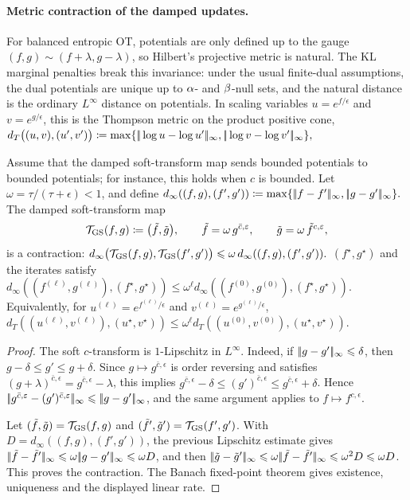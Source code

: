 \paragraph{Metric contraction of the damped updates.}
For balanced entropic OT, potentials are only defined up to the gauge $(f,g)\sim(f+\lambda,g-\lambda)$, so Hilbert's projective metric is natural. The KL marginal penalties break this invariance: under the usual finite-dual assumptions, the dual potentials are unique up to $\al$- and $\be$-null sets, and the natural distance is the ordinary $L^\infty$ distance on potentials. In scaling variables $u=e^{f/\epsilon}$ and $v=e^{g/\epsilon}$, this is the Thompson metric on the product positive cone,
\(d_T\big((u,v),(u',v')\big) \eqdef \max\{\norm{\log u-\log u'}_\infty,\norm{\log v-\log v'}_\infty\},\)
\begin{prop}\label{prop-unbalanced-sinkhorn-contraction}
Assume that the damped soft-transform map sends bounded potentials to bounded potentials; for instance, this holds when \(c\) is bounded. Let
$\omega=\tau/(\tau+\epsilon)<1$, and define
\(d_\infty((f,g),(f',g')) \eqdef \max\{\norm{f-f'}_\infty,\norm{g-g'}_\infty\}.\)
The damped soft-transform map
\[
\mathcal T_{\rm GS}(f,g)
\eqdef
\big(\tilde f,\tilde g\big),
\qquad
\tilde f=\omega\,g^{\bar c,\epsilon},
\qquad
\tilde g=\omega\,\tilde f^{c,\epsilon},
\]
is a contraction: \(d_\infty\big(\mathcal T_{\rm GS}(f,g),\mathcal T_{\rm GS}(f',g')\big) \leq \omega\, d_\infty((f,g),(f',g')).\)
$(f^\star,g^\star)$ and the iterates satisfy
\(d_\infty((f^{(\ell)},g^{(\ell)}),(f^\star,g^\star)) \leq \omega^\ell d_\infty((f^{(0)},g^{(0)}),(f^\star,g^\star)).\)
Equivalently, for $u^{(\ell)}=e^{f^{(\ell)}/\epsilon}$ and
$v^{(\ell)}=e^{g^{(\ell)}/\epsilon}$, \(d_T((u^{(\ell)},v^{(\ell)}),(u^\star,v^\star)) \leq \omega^\ell d_T((u^{(0)},v^{(0)}),(u^\star,v^\star)).\)
\end{prop}
\begin{proof}
The soft $c$-transform is $1$-Lipschitz in $L^\infty$. Indeed, if
$\norm{g-g'}_\infty\leq \delta$, then $g-\delta\leq g'\leq g+\delta$.
Since $g\mapsto g^{\bar c,\epsilon}$ is order reversing and satisfies
$(g+\lambda)^{\bar c,\epsilon}=g^{\bar c,\epsilon}-\lambda$, this implies
$g^{\bar c,\epsilon}-\delta \leq (g')^{\bar c,\epsilon} \leq g^{\bar c,\epsilon}+\delta$.
Hence
$\norm{g^{\bar c,\epsilon}-(g')^{\bar c,\epsilon}}_\infty\leq
\norm{g-g'}_\infty$, and the same argument applies to
$f\mapsto f^{c,\epsilon}$.

Let $(\tilde f,\tilde g)=\mathcal T_{\rm GS}(f,g)$ and
$(\tilde f',\tilde g')=\mathcal T_{\rm GS}(f',g')$. With
$D=d_\infty((f,g),(f',g'))$, the previous Lipschitz estimate gives
$\norm{\tilde f-\tilde f'}_\infty \leq \omega\norm{g-g'}_\infty \leq \omega D$,
and then
$\norm{\tilde g-\tilde g'}_\infty \leq \omega\norm{\tilde f-\tilde f'}_\infty \leq \omega^2D \leq \omega D$.
This proves the contraction. The Banach fixed-point theorem gives
existence, uniqueness and the displayed linear rate.
\end{proof}
